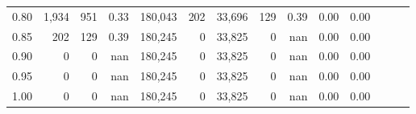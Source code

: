 \begin{tabular}{rrrrrrrrrrrrrr}
0.80 &   1,934 &    951 &  0.33 &  180,043 &      202 &  33,696 &     129 &  0.39 &  0.00 &      0.00 \\
0.85 &     202 &    129 &  0.39 &  180,245 &        0 &  33,825 &       0 &   nan &  0.00 &      0.00 \\
0.90 &       0 &      0 &   nan &  180,245 &        0 &  33,825 &       0 &   nan &  0.00 &      0.00 \\
0.95 &       0 &      0 &   nan &  180,245 &        0 &  33,825 &       0 &   nan &  0.00 &      0.00 \\
1.00 &       0 &      0 &   nan &  180,245 &        0 &  33,825 &       0 &   nan &  0.00 &      0.00 \\
\bottomrule
\end{tabular}
